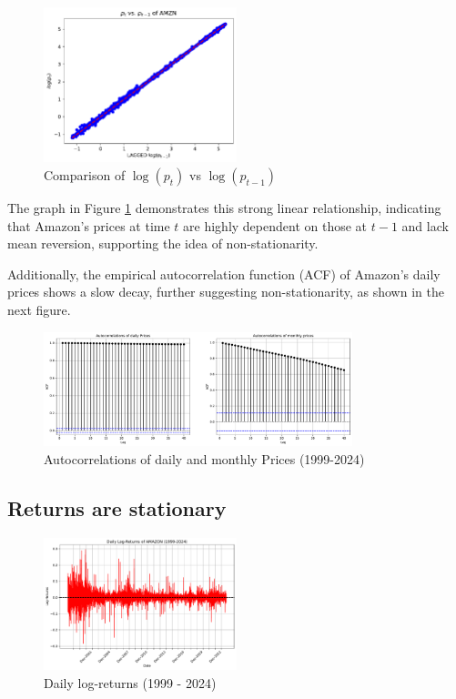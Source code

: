 \documentclass{article}
\begin{document}
\begin{figure}[H]
    \centering
    \includegraphics[width=0.5\textwidth]{Img/Laggedlog(p_t-1).pdf}
    \caption{Comparison of \( \log(p_t) \) vs \( \log(p_{t-1}) \)}
    \label{fig:LogptVSLogpt-1}
\end{figure}

\noindent The graph in Figure \ref{fig:LogptVSLogpt-1} demonstrates this strong linear 
relationship, indicating that Amazon's prices at time \( t \) are highly dependent on those at \( t-1 \) and lack mean reversion,
 supporting the idea of non-stationarity.

\noindent Additionally, the empirical autocorrelation function (ACF) of Amazon's daily prices shows a slow decay, further suggesting non-stationarity, as shown in the next figure.

\begin{figure}[H]
    \centering
    \includegraphics[width=0.8\textwidth]{Img/Autocorrel_daily_monthly.pdf}
    \caption{Autocorrelations of daily and monthly Prices (1999-2024)}
    \label{fig:Autocorrelations_daily_monthly}
\end{figure}

\subsection{Returns are stationary}

\begin{figure}[H]
    \centering
    \includegraphics[width=0.5\textwidth]{Img/Daily_Log_Returns.pdf}
    \caption{Daily log-returns (1999 - 2024)}
    \label{fig:Daily_log_returns}
\end{figure}
\end{document}
